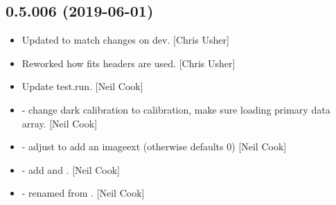 \documentclass[a4paper,10pt,english]{report}
\begin{document}
\subsection{0.5.006 (2019-06-01)}
\label{\detokenize{misc/changelog:id131}}\begin{itemize}
\item {} 
Updated to match changes on dev. {[}Chris Usher{]}

\item {} 
Reworked how fits headers are used. {[}Chris Usher{]}

\item {} 
Update test.run. {[}Neil Cook{]}

\item {} 
 - change dark calibration to  calibration,
make sure  loading primary data array. {[}Neil Cook{]}

\item {} 
 - adjust  to add an imageext (otherwise
defaults 0) {[}Neil Cook{]}

\item {} 
 - add  and . {[}Neil
Cook{]}

\item {} 
 - renamed from . {[}Neil
Cook{]}

\end{itemize}
\end{document}
